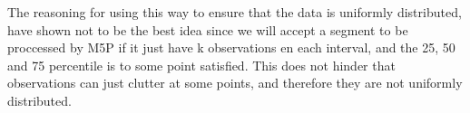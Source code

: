 The reasoning for using this way to ensure that the data is uniformly distributed, have shown not to be the best idea since we will accept a segment to be proccessed by M5P if it just have k observations en each interval, and the 25, 50 and 75 percentile is to some point satisfied. This does not hinder that observations can just clutter at some points, and therefore they are not uniformly distributed.

